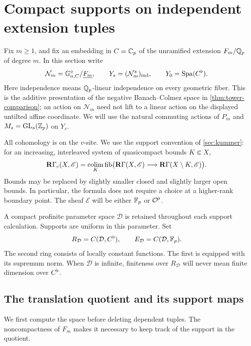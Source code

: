 \section{Compact supports on independent extension tuples}
\label{sec:independent-tuples}

Fix $m\geq 1$, and fix an embedding in $C=\mathbb C_p$ of the unramified
extension $F_m/\mathbb Q_p$ of degree $m$.  In this section write
\[
 \mathcal N_m=\mathbb G_{a,C}^{\diamond}/\underline{F_m},
 \qquad
 Y_s=(\mathcal N_m^s)_{\mathrm{ind}},
 \qquad Y_0=\operatorname{Spa}(C^\flat).
\]
Here independence means $\mathbb Q_p$-linear independence on every geometric
fiber.  This is the additive presentation of the negative
Banach--Colmez space in \cref{thm:tower-comparison}; an action on
$\mathcal N_m$ need not lift to a linear action on the displayed
untilted affine coordinate.  We will use the natural commuting actions
of $P_m$ and $M_s=\operatorname{GL}_s(\mathbb Z_p)$ on $Y_s$.

All cohomology is on the $v$-site.  We use the support convention of
\cref{sec:kummer}: for an increasing, interleaved system of
quasicompact bounds $K\Subset X$,
\begin{equation}
 \label{eq:ind-support-convention}
 \mathbf R\Gamma_c(X,\mathscr E)
 =\operatorname*{colim}_K\operatorname{fib}
   \bigl(\mathbf R\Gamma(X,\mathscr E)
       \longrightarrow\mathbf R\Gamma(X\setminus K,\mathscr E)\bigr).
\end{equation}
Bounds may be replaced by slightly smaller closed and slightly larger
open bounds.  In particular, the formula does not require a choice at
a higher-rank boundary point.  The sheaf $\mathscr E$ will be either
$\mathbb F_p$ or $\mathcal O^\flat$.

A compact profinite parameter space $\mathcal D$ is retained throughout
each support calculation.  Supports are uniform in this parameter.
Set
\[
 R_{\mathcal D}=C(\mathcal D,C^\flat),\qquad
 E_{\mathcal D}=C(\mathcal D,\mathbb F_p).
\]
The second ring consists of locally constant functions.  The first is
equipped with its supremum norm.  When $\mathcal D$ is infinite,
finiteness over $R_{\mathcal D}$ will never mean finite dimension over
$C^\flat$.

\subsection{The translation quotient and its support maps}

We first compute the space before deleting dependent tuples.  The
noncompactness of $F_m$ makes it necessary to keep track of the
support in the quotient.

